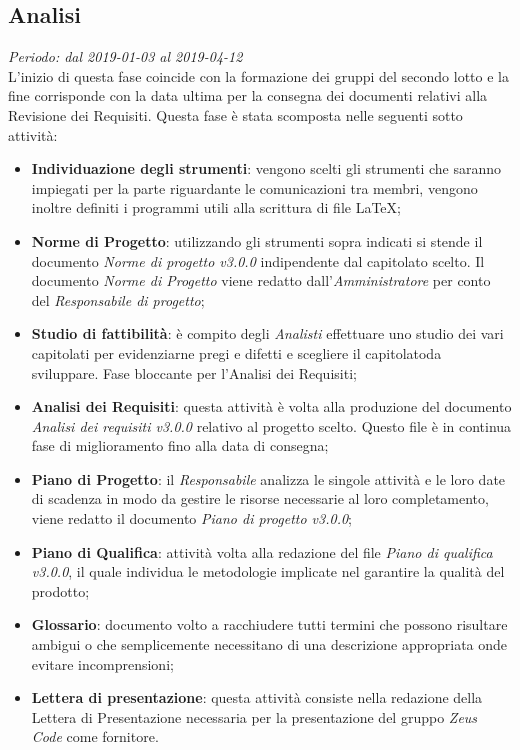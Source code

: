 \subsection{Analisi}
\textit{Periodo: dal 2019-01-03 al 2019-04-12}\\
L'inizio di questa fase coincide con la formazione dei gruppi del secondo lotto e la fine corrisponde con la data ultima per la consegna dei documenti relativi alla Revisione dei Requisiti.
Questa fase è stata scomposta nelle seguenti sotto attività:
\begin{itemize}
	\item \textbf{Individuazione degli strumenti}: vengono scelti gli strumenti che saranno impiegati per la parte riguardante le comunicazioni tra membri, vengono inoltre definiti i programmi utili alla scrittura di file \LaTeX; 
	\item \textbf{Norme di Progetto}: utilizzando gli strumenti sopra indicati si stende il documento \textit{Norme di progetto v3.0.0} indipendente dal capitolato scelto. Il documento \textit{Norme di Progetto} viene redatto dall'\textit{Amministratore} per conto del \textit{Responsabile di progetto};
	\item \textbf{Studio di fattibilità}: è compito degli \textit{Analisti} effettuare uno studio dei vari capitolati per evidenziarne pregi e difetti e scegliere il capitolato\glosp da sviluppare. Fase bloccante per l'Analisi dei Requisiti;
	\item \textbf{Analisi dei Requisiti}: questa attività è volta alla produzione del documento \textit{Analisi dei requisiti v3.0.0} relativo al progetto scelto. Questo file è in continua fase di miglioramento fino alla data di consegna;
	\item \textbf{Piano di Progetto}: il \textit{Responsabile} analizza le singole attività e le loro date di scadenza in modo da gestire le risorse necessarie al loro completamento, viene redatto il documento \textit{Piano di progetto v3.0.0};
	\item \textbf{Piano di Qualifica}: attività volta alla redazione del file \textit{Piano di qualifica v3.0.0}, il quale individua le metodologie implicate nel garantire la qualità del prodotto; 
	\item \textbf{Glossario}: documento volto a racchiudere tutti termini che possono risultare ambigui o che semplicemente necessitano di una descrizione appropriata onde evitare incomprensioni;
	\item \textbf{Lettera di presentazione}: questa attività consiste nella redazione della Lettera di Presentazione necessaria  per  la  presentazione del gruppo \textit{Zeus Code} come fornitore.
\end{itemize}

